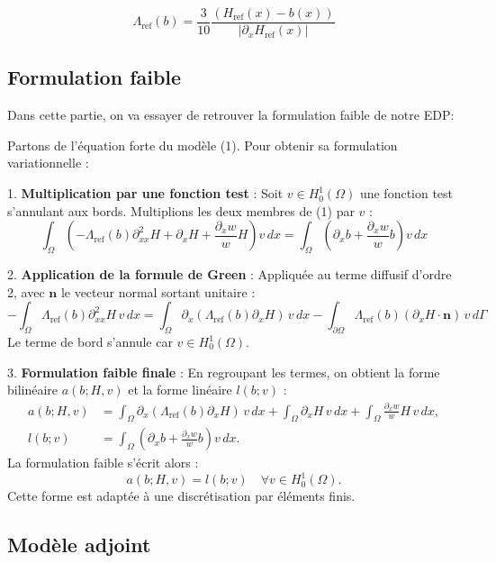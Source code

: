 \documentclass{article}
\begin{document}
\[
\Lambda_{\text{ref}}(b) = \frac{3}{10}\frac{(H_{\text{ref}}(x) - b(x))}{|\partial_{x}H_{\text{ref}}(x)|}
\]


\subsection{Formulation faible}
Dans cette partie, on va essayer de retrouver la formulation faible de notre EDP: \newline 

Partons de l'équation forte du modèle (1). Pour obtenir sa formulation variationnelle :  

1. \textbf{Multiplication par une fonction test} :  
Soit \( v \in H^1_0(\Omega) \) une fonction test s'annulant aux bords. Multiplions les deux membres de (1) par \( v \) :  
\[
\int_\Omega \left(-\Lambda_{\text{ref}}(b)\partial_{xx}^2H + \partial_xH + \frac{\partial_xw}{w}H\right)v \, dx = \int_\Omega \left(\partial_xb + \frac{\partial_xw}{w}b\right)v \, dx
\]

2. \textbf{Application de la formule de Green} :  
Appliquée au terme diffusif d'ordre 2, avec \( \mathbf{n} \) le vecteur normal sortant unitaire :  
\[
-\int_\Omega \Lambda_{\text{ref}}(b)\partial_{xx}^2H \, v \, dx = \int_\Omega \partial_x(\Lambda_{\text{ref}}(b)\partial_xH) \, v \, dx - \int_{\partial\Omega} \Lambda_{\text{ref}}(b)(\partial_xH \cdot \mathbf{n}) \, v \, d\Gamma
\]  
Le terme de bord s'annule car \( v \in H_0^1(\Omega) \).  

3. \textbf{Formulation faible finale} :  
En regroupant les termes, on obtient la forme bilinéaire \( a(b; H, v) \) et la forme linéaire \( l(b; v) \) :  
\[
\boxed{
\begin{aligned}
a(b; H, v) &= \int_\Omega \partial_x(\Lambda_{\text{ref}}(b) \partial_xH) \, v \, dx + \int_\Omega \partial_xH \, v \, dx + \int_\Omega \frac{\partial_xw}{w} H \, v \, dx, \\
l(b; v) &= \int_\Omega \left(\partial_xb + \frac{\partial_xw}{w}b\right)v \, dx.
\end{aligned}
}
\]  
La formulation faible s'écrit alors :  
\[
a(b; H, v) = l(b; v) \quad \forall v \in H^1_0(\Omega). \tag{3}
\]  
Cette forme est adaptée à une discrétisation par éléments finis.  

\subsection{Modèle adjoint}
\end{document}

